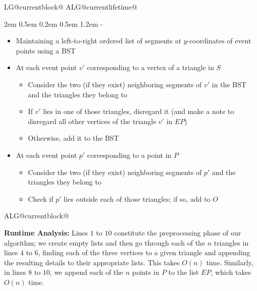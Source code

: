 \documentclass[11pt]{article}
\makeatletter
\newlength{\continueindent}
\renewenvironment{algorithmic}[1][0]%
   {%
   \edef\ALG@numberfreq{#1}%
   \def\@currentlabel{\theALG@line}%
   \setcounter{ALG@line}{0}%
   \setcounter{ALG@rem}{0}%
   \let\\\algbreak%
   \expandafter\edef\csname ALG@currentblock@\theALG@nested\endcsname{0}%
   \expandafter\let\csname ALG@currentlifetime@\theALG@nested\endcsname\relax%
   \begin{list}%
      {\ALG@step}%
      {%
      \rightmargin\z@%
      \itemsep\z@ \itemindent\z@ \listparindent2em%
      \partopsep\z@ \parskip\z@ \parsep\z@%
      \labelsep 0.5em \topsep 0.2em%
      \ifthenelse{\equal{#1}{0}}%
         {\labelwidth 0.5em}%
         {\labelwidth 1.2em}%
       \leftmargin\labelwidth \addtolength{\leftmargin}{\labelsep}
      \ALG@tlm\z@%
      }%
      \parshape 2 \leftmargin \linewidth \continueindent \dimexpr\linewidth-\continueindent\relax
   \setcounter{ALG@nested}{0}%
   \ALG@beginalgorithmic%
   }%
   {%
   \ALG@closeloops%
   \expandafter\ifnum\csname ALG@currentblock@\theALG@nested\endcsname=0\relax%
   \else%
      \PackageError{algorithmicx}{Some blocks are not closed!!!}{}%
   \fi%
   \ALG@endalgorithmic%
   \end{list}%
   }%
\makeatother
\begin{document}
\begin{enumerate}
\begin{minipage}[t]{0.9\textwidth}
\begin{algorithm}[H]
\begin{algorithmic}[1]
        \EndFor

        \begin{itemize}
            \item Maintaining a left-to-right ordered list of segments at $y$-coordinates of event points using a BST
            \item At each event point $v'$ corresponding to a vertex of a triangle in $S$
            \begin{itemize}
                \item Consider the two (if they exist) neighboring segments of $v'$ in the BST and the triangles they belong to
                \item If $v'$ lies in one of those triangles, disregard it (and make a note to disregard all other vertices of the triangle $v'$ in $EP$)
                \item Otherwise, add it to the BST
            \end{itemize}
            \item At each event point $p'$ corresponding to a point in $P$
            \begin{itemize}
                \item Consider the two (if they exist) neighboring segments of $p'$ and the triangles they belong to
                \item Check if $p'$ lies outside each of those triangles; if so, add to $O$
            \end{itemize}
        \end{itemize}

        
    \end{algorithmic}
    \end{algorithm}
    \end{minipage}

    \vspace{1cm}

    \textbf{Runtime Analysis:} Lines $1$ to $10$ constitute the preprocessing phase of our algorithm; we create empty lists and then go through each of the $n$ triangles in lines $4$ to $6$, finding each of the three vertices to a given triangle and appending the resulting details to their appropriate lists. This takes $O(n)$ time. Similarly, in lines $8$ to $10$, we append each of the $n$ points in $P$ to the list $EP$, which takes $O(n)$ time. \\


\end{enumerate}
\end{document}
